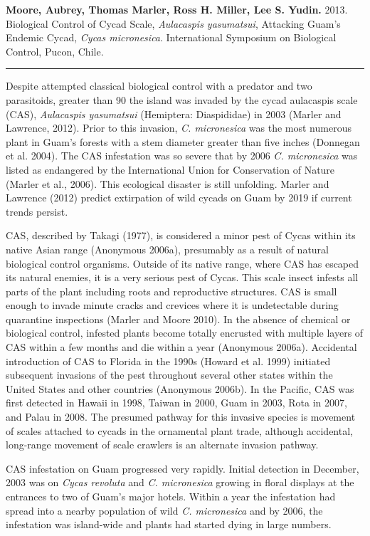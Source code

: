 \documentclass[12pt,oneside,english]{scrbook}
\begin{document}
\textbf{Moore, Aubrey, Thomas Marler, Ross H. Miller, Lee S. Yudin.} 2013. Biological Control of Cycad Scale, \textit{Aulacaspis yasumatsui},
Attacking Guam's Endemic Cycad, \textit{Cycas micronesica}. International Symposium on Biological Control, Pucon, Chile.
\hrule
Despite attempted classical biological control with a predator and two parasitoids,
greater than 90%
the island was invaded by the cycad aulacaspis scale (CAS), \textit{Aulacaspis yasumatsui}
(Hemiptera: Diaspididae) in 2003 (Marler and Lawrence, 2012). Prior to this invasion,
\textit{C. micronesica} was the most numerous plant in Guam's forests with a stem diameter
greater than five inches (Donnegan et al. 2004). The CAS infestation was so severe
that by 2006 \textit{C. micronesica} was listed as endangered by the International Union for
Conservation of Nature (Marler et al., 2006). This ecological disaster is still unfolding.
Marler and Lawrence (2012) predict extirpation of wild cycads on Guam by 2019 if
current trends persist.

CAS, described by Takagi (1977), is considered a minor pest of Cycas within its native
Asian range (Anonymous 2006a), presumably as a result of natural biological control
organisms. Outside of its native range, where CAS has escaped its natural enemies, it
is a very serious pest of Cycas. This scale insect infests all parts of the plant including
roots and reproductive structures. CAS is small enough to invade minute cracks and
crevices where it is undetectable during quarantine inspections (Marler and Moore
2010). In the absence of chemical or biological control, infested plants become totally
encrusted with multiple layers of CAS within a few months and die within a year
(Anonymous 2006a). Accidental introduction of CAS to Florida in the 1990s (Howard et
al. 1999) initiated subsequent invasions of the pest throughout several other states
within the United States and other countries (Anonymous 2006b). In the Pacific, CAS
was first detected in Hawaii in 1998, Taiwan in 2000, Guam in 2003, Rota in 2007, and
Palau in 2008. The presumed pathway for this invasive species is movement of scales
attached to cycads in the ornamental plant trade, although accidental, long-range
movement of scale crawlers is an alternate invasion pathway.

CAS infestation on Guam progressed very rapidly. Initial detection in December, 2003
was on \textit{Cycas revoluta} and \textit{C. micronesica} growing in floral displays at the entrances to
two of Guam's major hotels. Within a year the infestation had spread into a nearby
population of wild \textit{C. micronesica} and by 2006, the infestation was island-wide and
plants had started dying in large numbers.
\end{document}
